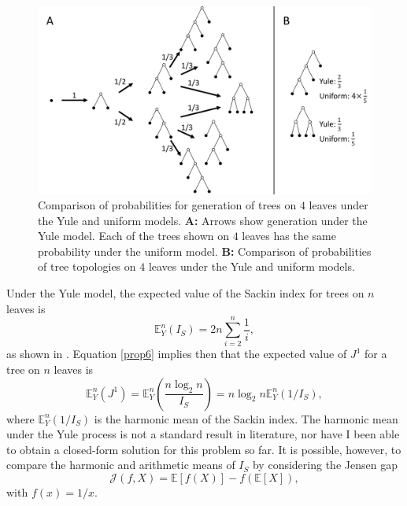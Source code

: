 \begin{figure}[h!]
    \centering
    \includegraphics[width=\textwidth]{Chapter_2/figures/yule-unif-figure.pdf}
    \caption{Comparison of probabilities for generation of trees on $4$ leaves
    under the Yule and uniform models. \textbf{A:} Arrows show generation under
    the Yule model. Each of the trees shown on $4$ leaves has the same
    probability under the uniform model. \textbf{B:} Comparison of probabilities
    of tree topologies on $4$ leaves under the Yule and uniform models.}
    \label{yule-unif-figure}
\end{figure}

Under the Yule model, the expected value of the Sackin index for trees on $n$
leaves is
\begin{equation}
    \mathbb{E}_Y^n(I_S) = 2n\sum_{i=2}^n \frac{1}{i},
\end{equation}
as shown in \citet{kirkpatrick_searching_1993}. Equation \eqref{prop6} implies
then that the expected value of $J^1$ for a tree on $n$ leaves is
\begin{equation}
    \mathbb{E}_Y^n(J^1) = \mathbb{E}_Y^n(\frac{n\log_2 n}{I_S}) = n\log_2 n
    \mathbb{E}_Y^n(1/I_S),
\end{equation}
where $\mathbb{E}_Y^n(1/I_S)$ is the harmonic mean of the Sackin index.
The harmonic mean under the Yule process is not a standard result in literature,
nor have I been able to obtain a closed-form solution for this problem so far.
It is possible, however, to compare the harmonic and arithmetic means of $I_S$ by
considering the Jensen gap
\begin{equation}\label{JensenGap}
    \mathcal{J}(f, X) = \mathbb{E}[f(X)] - f(\mathbb{E}[X]),
\end{equation}
with $f(x) = 1/x$.


